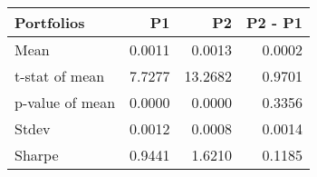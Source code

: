 \begin{tabular}{lrrr}
\toprule
Portfolios & P1 & P2 & P2 - P1 \\
\midrule
Mean & 0.0011 & 0.0013 & 0.0002 \\
t-stat of mean & 7.7277 & 13.2682 & 0.9701 \\
p-value of mean & 0.0000 & 0.0000 & 0.3356 \\
Stdev & 0.0012 & 0.0008 & 0.0014 \\
Sharpe & 0.9441 & 1.6210 & 0.1185 \\
\bottomrule
\end{tabular}
